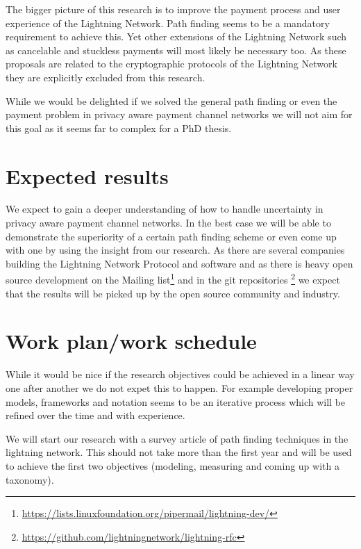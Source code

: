 \documentclass[a4paper]{paper}
\begin{document}
The bigger picture of this research is to improve the payment process and user experience of the Lightning Network.
Path finding seems to be a mandatory requirement to achieve this.
Yet other extensions of the Lightning Network such as cancelable and stuckless payments\cite{gondo2019stucklss} will most likely be necessary too.
As these proposals are related to the cryptographic protocols of the Lightning Network they are explicitly excluded from this research.

While we would be delighted if we solved the general path finding or even the payment problem in privacy aware payment channel networks we will not aim for this goal as it seems far to complex for a PhD thesis.


\section{Expected results}
We expect to gain a deeper understanding of how to handle uncertainty in privacy aware payment channel networks.
In the best case we will be able to demonstrate the superiority of a certain path finding scheme or even come up with one by using the insight from our research.
As there are several companies building the Lightning Network Protocol and software and as there is heavy open source development on the Mailing list\footnote{\url{https://lists.linuxfoundation.org/pipermail/lightning-dev/}} and in the git repositories \footnote{\url{https://github.com/lightningnetwork/lightning-rfc}} we expect that the results will be picked up by the open source community and industry.

\section{Work plan/work schedule}



While it would be nice if the research objectives could be achieved in a linear way one after another we do not expet this to happen.
For example developing proper models, frameworks and notation seems to be an iterative process which will be refined over the time and with experience.

We will start our research with a survey article of path finding techniques in the lightning network.
This should not take more than the first year and will be used to achieve the first two objectives (modeling, measuring and coming up with a taxonomy).
\end{document}

